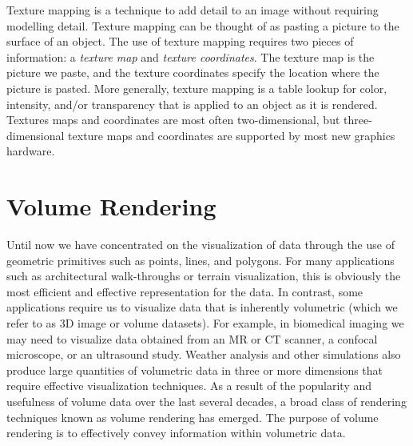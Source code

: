 	Texture mapping is a technique to add detail to an image without requiring modelling detail. Texture mapping can be thought of as pasting a picture to the surface of an object. The use of texture mapping requires two pieces of information: a \emph{texture map} and \emph{texture coordinates}. The texture map is the picture we paste, and the texture coordinates specify the location where the picture is pasted. More generally, texture mapping is a table lookup for color, intensity, and/or transparency that is applied to an object as it is rendered. Textures maps and coordinates are most often two-dimensional,
	but three-dimensional texture maps and coordinates are supported by most new graphics hardware.

\section{Volume Rendering}
\label{sec:volume_rendering}

	Until now we have concentrated on the visualization of data through the use of geometric primitives such as points, lines, and polygons.
	For many applications such as architectural walk-throughs or terrain visualization, this is obviously the most efficient and effective representation for the data.
	In contrast, some applications require us to visualize data that is inherently volumetric (which we refer to as 3D image or volume datasets).
	For example, in biomedical imaging we may need to visualize data obtained from an MR or CT scanner, a confocal microscope, or an ultrasound study.
	Weather analysis and other simulations also produce large quantities of volumetric data in three or more dimensions that require effective visualization techniques.
	As a result of the popularity and usefulness of volume data over the last several decades, a broad class of rendering techniques known as volume rendering has emerged. The purpose of volume rendering is to effectively convey information within volumetric data.
